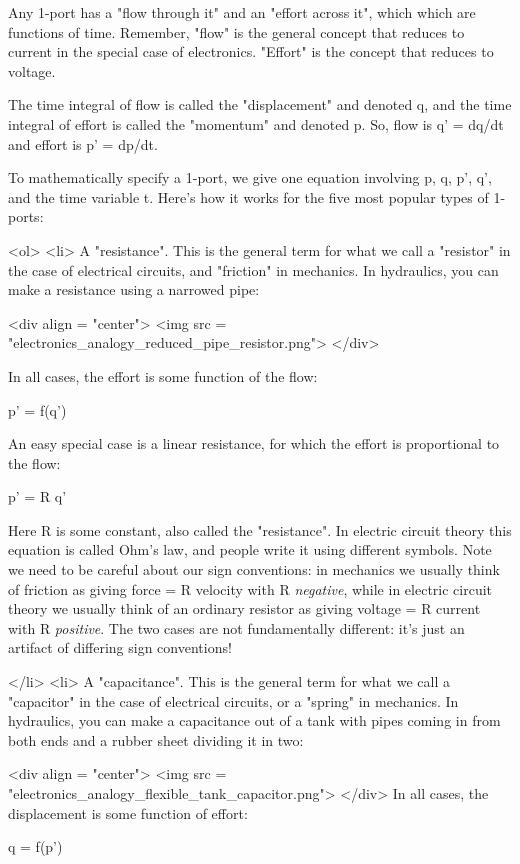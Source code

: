 Any 1-port has a "flow through it" and an "effort
across it", which which are functions of time.  Remember,
"flow" is the general concept that reduces to current in the
special case of electronics.  "Effort" is the concept that
reduces to voltage.

The time integral of flow is called the "displacement" and
denoted q, and the time integral of effort is called the
"momentum" and denoted p.  So, flow is q' = dq/dt and effort
is p' = dp/dt.

To mathematically specify a 1-port, we give one equation involving p,
q, p', q', and the time variable t.  Here's how it works for the five
most popular types of 1-ports:

<ol>
<li> 
  A "resistance".  This is the general term for what we
  call a "resistor" in the case of electrical circuits, and
  "friction" in mechanics.  In hydraulics, you can make
  a resistance using a narrowed pipe:

<div align = "center">
<img src = "electronics_analogy_reduced_pipe_resistor.png">
</div>

In all cases, the effort is some function of the flow:

  p' = f(q')

  An easy special case is a linear resistance, for which the effort
  is proportional to the flow:

  p' = R q'

  Here R is some constant, also called the "resistance".  In
  electric circuit theory this equation is called Ohm's law, and
  people write it using different symbols.  Note we need to be careful
  about our sign conventions: in mechanics we usually think of
  friction as giving force = R velocity with R \emph{negative}, while
  in electric circuit theory we usually think of an ordinary resistor
  as giving voltage = R current with R \emph{positive}.  The two cases
  are not fundamentally different: it's just an artifact of differing
  sign conventions!

</li>
<li> A "capacitance".  This is the general term for what we
  call a "capacitor" in the case of electrical circuits, or
  a "spring" in mechanics.  In hydraulics, you can make a
  capacitance out of a tank with pipes coming in from both ends and a
  rubber sheet dividing it in two:

<div align = "center">
<img src = "electronics_analogy_flexible_tank_capacitor.png">
</div>
  In all cases, the displacement is some
  function of effort:

  q = f(p')

